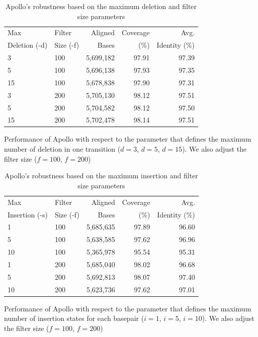 \documentclass[a4paper]{article}
\begin{document}
\begin{table}[htb]
\begin{center}
\caption{Apollo's robustness based on the maximum deletion and filter size parameters}
\label{supptab:deletion}
\begin{tabular}{|l|l|rrr|}
\hline Max & Filter & Aligned & Coverage & Avg.\\
Deletion (-d) & Size (-f) & Bases & (\%) & Identity (\%) \\\hline
3  & 100 & 5,699,182 & 97.91 & 97.39 \\%
5  & 100 & 5,696,138 & 97.93 & 97.35 \\%
15  & 100 & 5,678,838 & 97.90 & 97.31 \\%
3  & 200 & 5,705,130 & 98.12 & 97.51 \\%
5  & 200 & 5,704,582 & 98.12 & 97.50 \\%
15  & 200 & 5,702,478 & 98.14 & 97.51 \\\hline
\end{tabular}
\end{center}
{\small Performance of Apollo with respect to the parameter that defines the maximum number of deletion in one transition ($d=3$, $d=5$, $d=15$). We also adjust the filter size ($f=100$, $f=200$)}
\end{table}

\begin{table}[htb]
\begin{center}
\caption{Apollo's robustness based on the maximum insertion and filter size parameters}
\label{supptab:insertion}
\begin{tabular}{|l|l|rrr|}
\hline Max & Filter & Aligned & Coverage & Avg.\\
Insertion (-s) & Size (-f) & Bases & (\%) & Identity (\%) \\\hline
1  & 100 & 5,685,635 & 97.89 & 96.60 \\%
5  & 100 & 5,638,585 & 97.62 & 96.96 \\%
10  & 100 & 5,365,978 & 95.54 & 95.31 \\%
1  & 200 & 5,685,040 & 98.02 & 96.68 \\%
5  & 200 & 5,692,813 & 98.07 & 97.40 \\%
10  & 200 & 5,623,736 & 97.62 & 97.01 \\\hline
\end{tabular}
\end{center}
{\small Performance of Apollo with respect to the parameter that defines the maximum number of insertion states for each basepair ($i=1$, $i=5$, $i=10$). We also adjust the filter size ($f=100$, $f=200$)}
\end{table}
\end{document}
